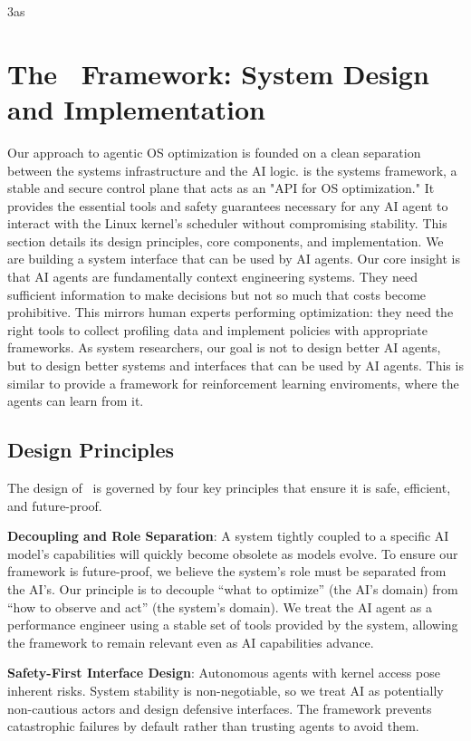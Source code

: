 3as\section{The \sys\ Framework: System Design and Implementation}
\label{sec:schedcp_framework}

Our approach to agentic OS optimization is founded on a clean separation between the systems infrastructure and the AI logic. \textbf{\sys} is the systems framework, a stable and secure control plane that acts as an "API for OS optimization." It provides the essential tools and safety guarantees necessary for any AI agent to interact with the Linux kernel's scheduler without compromising stability. This section details its design principles, core components, and implementation.
We are building a system interface that can be used by AI agents. Our core insight is that AI agents are fundamentally context engineering systems. They need sufficient information to make decisions but not so much that costs become prohibitive. This mirrors human experts performing optimization: they need the right tools to collect profiling data and implement policies with appropriate frameworks. As system researchers, our goal is not to design better AI agents, but to design better systems and interfaces that can be used by AI agents. This is similar to provide a framework for reinforcement learning enviroments, where the agents can learn from it.

\subsection{Design Principles}
The design of \sys\ is governed by four key principles that ensure it is safe, efficient, and future-proof.

\textbf{Decoupling and Role Separation}: A system tightly coupled to a specific AI model's capabilities will quickly become obsolete as models evolve. To ensure our framework is future-proof, we believe the system's role must be separated from the AI's. Our principle is to decouple ``what to optimize'' (the AI's domain) from ``how to observe and act'' (the system's domain). We treat the AI agent as a performance engineer using a stable set of tools provided by the system, allowing the framework to remain relevant even as AI capabilities advance.

\textbf{Safety-First Interface Design}: Autonomous agents with kernel access pose inherent risks. System stability is non-negotiable, so we treat AI as potentially non-cautious actors and design defensive interfaces. The framework prevents catastrophic failures by default rather than trusting agents to avoid them.

